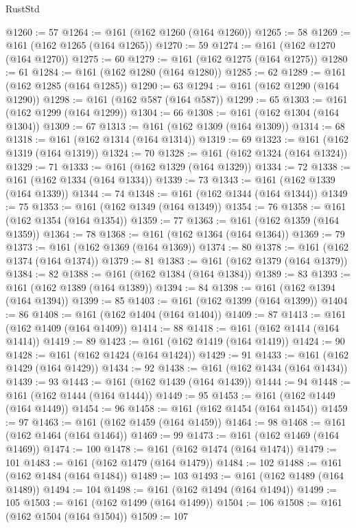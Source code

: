 \begin{lexlean}{RustStd}
\begin{coremodule}
{\begin{coremodule}
{{{{{{{{{{{{{{{{{{{{{{{{{{{{{{{{{{{{{{{{{{{{{{{{{{{{{{{{{{{{@1260 := 57
@1264 := @161 (@162 @1260 (@164 @1260))
@1265 := 58
@1269 := @161 (@162 @1265 (@164 @1265))
@1270 := 59
@1274 := @161 (@162 @1270 (@164 @1270))
@1275 := 60
@1279 := @161 (@162 @1275 (@164 @1275))
@1280 := 61
@1284 := @161 (@162 @1280 (@164 @1280))
@1285 := 62
@1289 := @161 (@162 @1285 (@164 @1285))
@1290 := 63
@1294 := @161 (@162 @1290 (@164 @1290))
@1298 := @161 (@162 @587 (@164 @587))
@1299 := 65
@1303 := @161 (@162 @1299 (@164 @1299))
@1304 := 66
@1308 := @161 (@162 @1304 (@164 @1304))
@1309 := 67
@1313 := @161 (@162 @1309 (@164 @1309))
@1314 := 68
@1318 := @161 (@162 @1314 (@164 @1314))
@1319 := 69
@1323 := @161 (@162 @1319 (@164 @1319))
@1324 := 70
@1328 := @161 (@162 @1324 (@164 @1324))
@1329 := 71
@1333 := @161 (@162 @1329 (@164 @1329))
@1334 := 72
@1338 := @161 (@162 @1334 (@164 @1334))
@1339 := 73
@1343 := @161 (@162 @1339 (@164 @1339))
@1344 := 74
@1348 := @161 (@162 @1344 (@164 @1344))
@1349 := 75
@1353 := @161 (@162 @1349 (@164 @1349))
@1354 := 76
@1358 := @161 (@162 @1354 (@164 @1354))
@1359 := 77
@1363 := @161 (@162 @1359 (@164 @1359))
@1364 := 78
@1368 := @161 (@162 @1364 (@164 @1364))
@1369 := 79
@1373 := @161 (@162 @1369 (@164 @1369))
@1374 := 80
@1378 := @161 (@162 @1374 (@164 @1374))
@1379 := 81
@1383 := @161 (@162 @1379 (@164 @1379))
@1384 := 82
@1388 := @161 (@162 @1384 (@164 @1384))
@1389 := 83
@1393 := @161 (@162 @1389 (@164 @1389))
@1394 := 84
@1398 := @161 (@162 @1394 (@164 @1394))
@1399 := 85
@1403 := @161 (@162 @1399 (@164 @1399))
@1404 := 86
@1408 := @161 (@162 @1404 (@164 @1404))
@1409 := 87
@1413 := @161 (@162 @1409 (@164 @1409))
@1414 := 88
@1418 := @161 (@162 @1414 (@164 @1414))
@1419 := 89
@1423 := @161 (@162 @1419 (@164 @1419))
@1424 := 90
@1428 := @161 (@162 @1424 (@164 @1424))
@1429 := 91
@1433 := @161 (@162 @1429 (@164 @1429))
@1434 := 92
@1438 := @161 (@162 @1434 (@164 @1434))
@1439 := 93
@1443 := @161 (@162 @1439 (@164 @1439))
@1444 := 94
@1448 := @161 (@162 @1444 (@164 @1444))
@1449 := 95
@1453 := @161 (@162 @1449 (@164 @1449))
@1454 := 96
@1458 := @161 (@162 @1454 (@164 @1454))
@1459 := 97
@1463 := @161 (@162 @1459 (@164 @1459))
@1464 := 98
@1468 := @161 (@162 @1464 (@164 @1464))
@1469 := 99
@1473 := @161 (@162 @1469 (@164 @1469))
@1474 := 100
@1478 := @161 (@162 @1474 (@164 @1474))
@1479 := 101
@1483 := @161 (@162 @1479 (@164 @1479))
@1484 := 102
@1488 := @161 (@162 @1484 (@164 @1484))
@1489 := 103
@1493 := @161 (@162 @1489 (@164 @1489))
@1494 := 104
@1498 := @161 (@162 @1494 (@164 @1494))
@1499 := 105
@1503 := @161 (@162 @1499 (@164 @1499))
@1504 := 106
@1508 := @161 (@162 @1504 (@164 @1504))
@1509 := 107
}}}}}}}}}}}}}}}}}}}}}}}}}}}}}}}}}}}}}}}}}}}}}}}}}}}}}}}}}}}}
\end{coremodule}}
\end{coremodule}
\end{lexlean}
